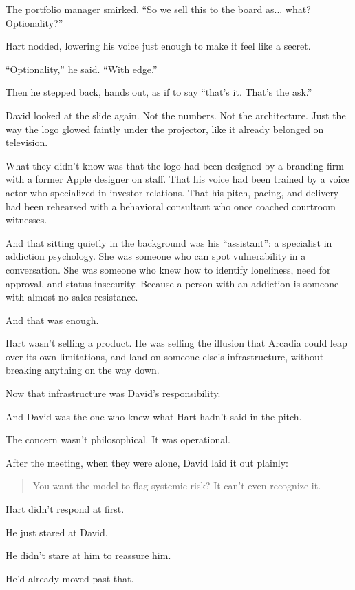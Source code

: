 The portfolio manager smirked. “So we sell this to the board as... what? Optionality?”

Hart nodded, lowering his voice just enough to make it feel like a secret.

“Optionality,” he said.  
“With edge.”

Then he stepped back, hands out, as if to say ``that’s it. That’s the ask.''

David looked at the slide again.  
Not the numbers.  
Not the architecture.  
Just the way the logo glowed faintly under the projector, like it already belonged on television.

What they didn’t know 
was that the logo had been designed by a branding firm with a former Apple designer on staff.
That his voice had been trained by a voice actor who specialized in investor relations.
That his pitch, pacing, and delivery had been rehearsed with a behavioral consultant who once coached courtroom witnesses.

And that sitting quietly in the background was his ``assistant'': a specialist in addiction psychology.
She was someone who can spot vulnerability in a conversation.
She was someone who knew how to identify loneliness, need for approval, and status insecurity.
Because a person with an addiction is someone with almost no sales resistance.

And that was enough.

Hart wasn’t selling a product.
He was selling the illusion that Arcadia could leap over its own limitations, and land on someone else’s infrastructure, 
without breaking anything on the way down.

Now that infrastructure was David’s responsibility.

And David was the one who knew what Hart hadn’t said in the pitch.

The concern wasn’t philosophical. It was operational.

After the meeting, when they were alone, David laid it out plainly:

\begin{quote}
  You want the model to flag systemic risk? It can’t even recognize it. 
\end{quote}

Hart didn’t respond at first.

He just stared at David.

He didn't stare at him to reassure him. 

He’d already moved past that.

